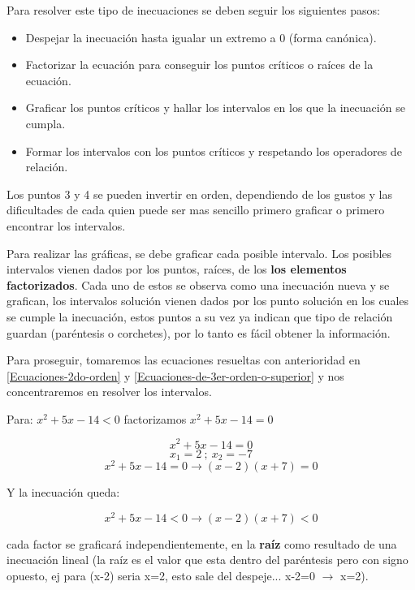     Para resolver este tipo de inecuaciones se deben seguir los siguientes pasos:

    \begin{itemize}
        \item Despejar la inecuación hasta igualar un extremo a 0 (forma canónica).
        \item Factorizar la ecuación para conseguir los puntos críticos o raíces
            de la ecuación.
        \item Graficar los puntos críticos y hallar los intervalos en los que
            la inecuación se cumpla.
        \item Formar los intervalos con los puntos críticos y respetando los
            operadores de relación.
    \end{itemize}

    Los puntos 3 y 4 se pueden invertir en orden, dependiendo de los gustos y las
    dificultades de cada quien puede ser mas sencillo primero graficar o primero
    encontrar los intervalos.

    Para realizar las gráficas, se debe graficar cada
    posible intervalo. Los posibles intervalos vienen dados por los puntos, raíces,
    de los \textbf{los elementos factorizados}. Cada uno de estos se observa como
    una inecuación nueva y se grafican, los intervalos solución vienen dados por
    los punto solución en los cuales se cumple la inecuación, estos puntos
    a su vez ya indican que tipo de relación guardan (paréntesis o corchetes),
    por lo tanto es fácil obtener la información.


    Para proseguir, tomaremos las ecuaciones resueltas con anterioridad en
    \ref{Ecuaciones-2do-orden} y \ref{Ecuaciones-de-3er-orden-o-superior}
    y nos concentraremos en resolver los intervalos.

    Para: $x^2+5x-14 < 0$ factorizamos $x^2+5x-14 = 0$


    $$ x^2 + 5x -14 = 0$$
    $$ x_1 = 2\ ;\    x_2 = -7$$
    $$ x^2 + 5x -14 = 0 \longrightarrow  (x-2)(x+7) =0 $$

    Y la inecuación queda:

    $$ x^2 + 5x -14 < 0 \longrightarrow  (x-2)(x+7) < 0 $$

    cada factor se graficará independientemente, en la \textbf{raíz} como resultado
    de una inecuación lineal (la raíz es el valor
    que esta dentro del paréntesis pero con signo opuesto, ej para (x-2) seria
    x=2, esto sale del despeje... x-2=0 $\rightarrow$ x=2).


